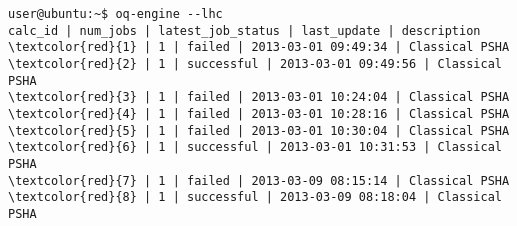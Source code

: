 \begin{Verbatim}[frame=single, commandchars=\\\{\}, fontsize=\small]
user@ubuntu:~$ oq-engine --lhc
calc_id | num_jobs | latest_job_status | last_update | description
\textcolor{red}{1} | 1 | failed | 2013-03-01 09:49:34 | Classical PSHA
\textcolor{red}{2} | 1 | successful | 2013-03-01 09:49:56 | Classical PSHA
\textcolor{red}{3} | 1 | failed | 2013-03-01 10:24:04 | Classical PSHA
\textcolor{red}{4} | 1 | failed | 2013-03-01 10:28:16 | Classical PSHA
\textcolor{red}{5} | 1 | failed | 2013-03-01 10:30:04 | Classical PSHA
\textcolor{red}{6} | 1 | successful | 2013-03-01 10:31:53 | Classical PSHA
\textcolor{red}{7} | 1 | failed | 2013-03-09 08:15:14 | Classical PSHA
\textcolor{red}{8} | 1 | successful | 2013-03-09 08:18:04 | Classical PSHA
\end{Verbatim}